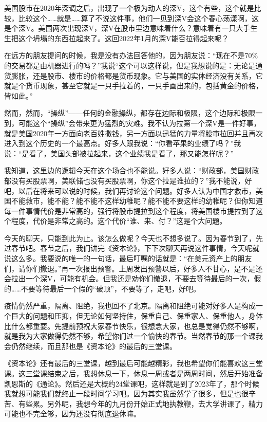 \documentclass[UTF8, 12pt, a4paper]{ctexrep}
\begin{document}
美国股市在2020年深调之后，出现了一个极为动人的深V，这个有些，这个就是比较，比较这个……就是……算了不说这件事，他们一见到深V会这个春心荡漾啊，这是个深V。美国两次出现深V，深V在股市里边意味着什么？意味着有一只大手生生把这个坍塌的东西拉起来了。这回2022年1月的深V能否拉得起来呢？

在远方的朋友提问的时候，我是没有办法回答他的，因为朋友说：“现在不是70\%的交易都是由机器进行的吗？”我说“这个可以这样说，但是我想说的是：无论是通货膨胀，还是股市、楼市的价格都是货币现象。它与美国的实体经济没有关系，它就是个货币现象，甚至它就是一只手拉着的，一只手画出来的，包括黄金的价格，皆如此。”

然而，然而，“操纵”——任何的金融操纵，都存在边际和极限，这个边际和极限一到，可能这个“操纵”会带来更为猛烈的灾难。我不认为拉第一个深V是一件好事，就是美国2020年一方面向老百姓撒钱，另一方面以迅猛的力量将股市拉回并且再次进入到这个历史的一个最高点。好多人跟我说：“你看苹果的业绩了吗？”我说：“是看了，美国头部被拉起来，这个业绩我是看了，那又能怎样呢？”

我知道，这里边的逻辑今天在这个场合也不能说。好多人说：“财政部，美国财政部没有买股票啊，美联储也没有买股票啊，你这个拉是谁拉的？”我不能说，好吧，以后在将来可以说的时候，我们再讨论这个问题。好多人认为中国才救市，美国不能救市，能不能？能不能不这样幼稚呢？能不能不要这样的幼稚呢？但你知道每一件事情代价是非常高的，强行将股市提拉到这个程度，将美国楼市提拉到了这个程度，代价是非常之高的。这个代价“谁、来、付？”这是个大问题。

今天的聊天，只能到此为止。该怎么做呢？今天也不想多说了。因为春节到了，先过春节吧。春节之后，我们讲完《资本论》，下下次聊天再说这件事情，今天呢就说这么多。我要说的唯一的一句话，最后叮嘱的话就是：“在美元资产上的朋友们，请你们撤退。”再一次报出预警。上周发出预警以后，好多人不甘心，是不是还会拉出一个深V，可能有机会。但我还是劝你们撤退，不要去等待最后的一次，假的……不要等待最后一个假的“破顶”，不要等了，走吧，好吧。

疫情仍然严重，隔离、阻绝，我也回不了北京。隔离和阻绝可能对好多人是构成一个巨大的问题和压抑，但无论如何坚持住，保重自己、保重家人、保重他人，身体比什么都重要。先提前预祝大家春节快乐，很想念大家，也总是觉得仍然不够啊，就是我为大家做得仍然不够，希望你们过一个愉快的春节。当然春节的那一个课我会仍然继续，而且那也是《资本论》的最后的三堂课。

《资本论》还有最后的三堂课，越到最后可能越精彩，我也希望你们能喜欢这三堂课。这三堂课结束之后，我想休息一下，休息一周或者是两周时间，然后开始准备凯恩斯的《通论》。然后还是大概约24堂课吧，这样就是到了2023年了，那个时候我就想可能我们就终止一段时间学习吧。因为其实我虽然学了很多，但是也很辛苦、有些累。另外呢，我想今年的九月份开始正式地执教鞭，去大学讲课了，精力可能也不完全够，因为还没有彻底退休嘛。
\end{document}
